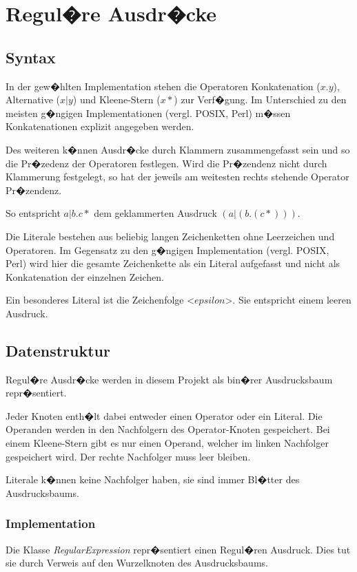 \chapter{Regul�re Ausdr�cke}

\section{Syntax}
In der gew�hlten Implementation stehen die Operatoren Konkatenation ($x.y$),
Alternative ($x|y$) und Kleene-Stern ($x*$) zur Verf�gung. Im Unterschied zu den
meisten g�ngigen Implementationen (vergl. POSIX\cite{RegExPOSIX}, Perl\cite{RegExPerl}) m�ssen Konkatenationen
explizit angegeben werden.

Des weiteren k�nnen Ausdr�cke durch Klammern zusammengefasst sein und so die
Pr�zedenz der Operatoren festlegen. Wird die Pr�zendenz nicht durch Klammerung
festgelegt, so hat der jeweils am weitesten rechts stehende Operator Pr�zendenz.

So entspricht $a|b.c*$ dem geklammerten Ausdruck $(a|(b.(c*)))$.

Die Literale bestehen aus beliebig langen Zeichenketten ohne Leerzeichen und
Operatoren. Im Gegensatz zu den g�ngigen Implementation (vergl. POSIX\cite{RegExPOSIX}, Perl\cite{RegExPerl}) wird
hier die gesamte Zeichenkette als ein Literal aufgefasst und nicht als Konkatenation
der einzelnen Zeichen.

Ein besonderes Literal ist die Zeichenfolge <$epsilon$>. Sie
entspricht einem leeren Ausdruck.

\section{Datenstruktur}
Regul�re Ausdr�cke werden in diesem Projekt als bin�rer Ausdrucksbaum
repr�sentiert.

Jeder Knoten enth�lt dabei entweder einen Operator oder ein Literal.
Die Operanden werden in den Nachfolgern des Operator-Knoten gespeichert. Bei
einem Kleene-Stern gibt es nur einen Operand, welcher im linken Nachfolger
gespeichert wird. Der rechte Nachfolger muss leer bleiben.

Literale k�nnen keine Nachfolger haben, sie sind immer Bl�tter des Ausdrucksbaums.

\subsection{Implementation}
Die Klasse \textit{RegularExpression} repr�sentiert einen Regul�ren Ausdruck.
Dies tut sie durch Verweis auf den Wurzelknoten des Ausdrucksbaums.

